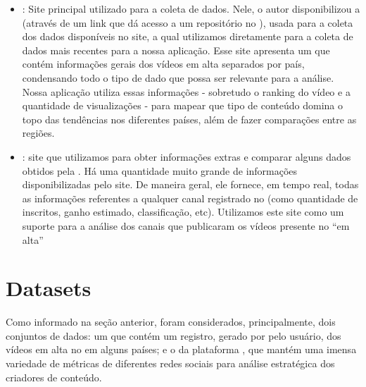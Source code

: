   \begin{itemize}
    \item \href{https://www.kaggle.com/datasets/datasnaek/youtube-new}{} : Site principal utilizado para a coleta de dados. Nele, o autor disponibilizou a  (através de um link que dá acesso a um repositório no \href{https://github.com/mitchelljy/Trending-YouTube-Scraper}{}), usada para a coleta dos dados disponíveis no site, a qual utilizamos diretamente para a coleta de dados mais recentes para a nossa aplicação. Esse site apresenta um  que contém informações gerais dos vídeos em alta separados por país, condensando todo o tipo de dado que possa ser relevante para a análise. Nossa aplicação utiliza essas informações - sobretudo o ranking do vídeo e a quantidade de visualizações - para mapear que tipo de conteúdo domina o topo das tendências nos diferentes países, além de fazer comparações entre as regiões.
    \item \href{https://socialblade.com/}{}: site que utilizamos para obter informações extras e comparar alguns dados obtidos pela . Há uma quantidade muito grande de informações disponibilizadas pelo site. De maneira geral, ele fornece, em tempo real, todas as informações referentes a qualquer canal registrado no  (como quantidade de inscritos, ganho estimado, classificação, etc). Utilizamos este site como um suporte para a análise dos canais que publicaram os vídeos presente no ``em alta''
  \end{itemize}


\chapter{Datasets}

  Como informado na seção anterior, foram considerados, principalmente, dois conjuntos de dados: um que contém um registro, gerado por  pelo usuário, dos vídeos em alta no  em alguns países; e o da plataforma , que mantém uma imensa variedade de métricas de diferentes redes sociais para análise estratégica dos criadores de conteúdo.


